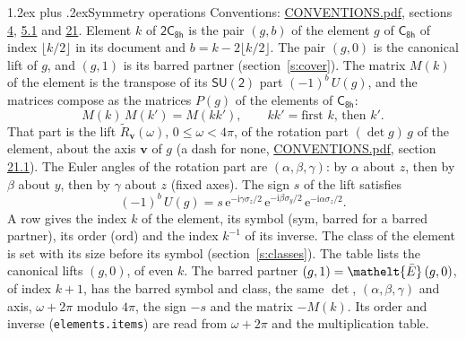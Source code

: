\documentclass[10pt,a4paper]{article}
\makeatletter
\renewcommand\section{\@startsection{section}{1}{\z@}{-3ex plus -1ex minus -.2ex}%
  {1.2ex plus .2ex}{\normalfont\large\sffamily\bfseries\color{parttitle}}}
\numberwithin{equation}{section}
\newcommand{\eltfont}[1]{{\let\sigma\eltsigma\mathelt{#1}}}
\newcommand{\grp}[1]{\mathsf{#1}}
\newcommand{\elt}[1]{\eltfont{#1}}
\newcommand{\vv}{\mathbf{v}}
\newcommand{\iunit}{\mathrm{i}}
\newcommand{\expe}{\mathrm{e}}
\newcommand{\barred}[1]{\bar{#1}}
\newcommand{\lift}[1]{\tilde{#1}}
\newcommand{\pauli}[1]{\sigma_{#1}}
\makeatother
\begin{document}
\section{Symmetry operations}\label{s:elements}
Conventions: \href{../../CONVENTIONS.pdf}{CONVENTIONS.pdf}, sections \href{../../../rotation/CONVENTIONS.pdf\#conv.4}{4}, \href{../../../rotation/CONVENTIONS.pdf\#conv.5.1}{5.1} and \href{../../CONVENTIONS.pdf\#conv.21}{21}.
\leavevmode\label{n:index.element}\label{n:element.g}Element $k$ of $\grp{2C_{8h}}$ is the pair $(g, b)$ of the element $g$ of \href{../../../rotation/data/pdf/C8h.pdf}{$\grp{C_{8h}}$} of index $\lfloor k/2\rfloor$ in its document and $b = k - 2\lfloor k/2\rfloor$. The pair $(g, 0)$ is the canonical lift of $g$, and $(g, 1)$ is its barred partner (section~\ref{s:cover}). \label{n:matrix.element.pin}\label{n:matrix.element}The matrix $M(k)$ of the element is the transpose of its $\grp{SU(2)}$ part $(-1)^{b}\,U(g)$, and the matrices compose as the matrices $P(g)$ of the elements of $\grp{C_{8h}}$:
\begin{equation}\label{e:mprod}M(k)\,M(k') = M(kk'),\qquad kk' = \text{first } k\text{, then } k'.\end{equation}
\leavevmode\label{n:angle.omega}\label{n:vector.axis}\label{n:vector.pole}That part is the lift $\lift{R}_{\vv}(\omega)$, $0 \le \omega < 4\pi$, of the rotation part $(\det g)\,g$ of the element, about the axis $\vv$ of $g$ (a dash for none, \href{../../CONVENTIONS.pdf}{CONVENTIONS.pdf}, section \href{../../CONVENTIONS.pdf\#conv.21.1}{21.1}). \label{n:angle.euler.alpha}\label{n:angle.euler.beta}\label{n:angle.euler.gamma}\label{n:vector.coordinates}The Euler angles of the rotation part are $(\alpha,\beta,\gamma)$: by $\alpha$ about $z$, then by $\beta$ about $y$, then by $\gamma$ about $z$ (fixed axes). \label{n:local.euler.sign}The sign $s$ of the lift satisfies
\begin{equation}\label{e:euler}(-1)^{b}\,U(g) = s\,\expe^{-\iunit\gamma\pauli{z}/2}\,\expe^{-\iunit\beta\pauli{y}/2}\,\expe^{-\iunit\alpha\pauli{z}/2}.\end{equation}
\leavevmode\label{n:index.element.inverse}\label{n:head.sym}\label{n:head.ord}A row gives the index $k$ of the element, its symbol (sym, barred for a barred partner), its order (ord) and the index $k^{-1}$ of its inverse. \label{n:head.class}The class of the element is set with its size before its symbol (section~\ref{s:classes}).
The table lists the canonical lifts $(g, 0)$, of even $k$. The barred partner $(g, 1) = \elt{\barred{E}}\,(g, 0)$, of index $k + 1$, has the barred symbol and class, the same $\det$, $(\alpha,\beta,\gamma)$ and axis, $\omega + 2\pi$ modulo $4\pi$, the sign $-s$ and the matrix $-M(k)$. Its order and inverse (\texttt{elements.items}) are read from $\omega + 2\pi$ and the multiplication table.
\end{document}
